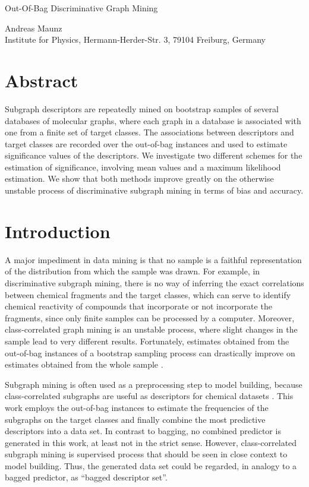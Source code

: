 \documentclass{article}
\begin{document}

\begin{center}
\begin{huge}Out-Of-Bag Discriminative Graph Mining\end{huge}

Andreas Maunz \\Institute for Physics, Hermann-Herder-Str. 3, 79104 Freiburg, Germany
\end{center}

\section{Abstract}
Subgraph descriptors are repeatedly mined on bootstrap samples of several databases of molecular graphs, where each graph in a database is associated with one from a finite set of target classes. 
The associations between descriptors and target classes are recorded over the out-of-bag instances and used to estimate significance values of the descriptors. 
We investigate two different schemes for the estimation of significance, involving mean values and a maximum likelihood estimation.
We show that both methods improve greatly on the otherwise unstable process of discriminative subgraph mining in terms of bias and accuracy.

\section{Introduction}
A major impediment in data mining is that no sample is a faithful representation of the distribution from which the sample was drawn. 
For example, in discriminative subgraph mining, there is no way of inferring the exact correlations between chemical fragments and the target classes, which can serve to identify chemical reactivity of compounds that incorporate or not incorporate the fragments, since only finite samples can be processed by a computer. 
Moreover, class-correlated graph mining is an unstable process, where slight changes in the sample lead to very different results. 
Fortunately, estimates obtained from the out-of-bag instances of a bootstrap sampling process can drastically improve on estimates obtained from the whole sample \cite{bylander02estimating, breiman96oob}.

Subgraph mining is often used as a preprocessing step to model building, because class-correlated subgraphs are useful as descriptors for chemical datasets \cite{bringmann10lego,maunz11efficient}.
This work employs the out-of-bag instances to estimate the frequencies of the subgraphs on the target classes and finally combine the most predictive descriptors into a data set. 
In contrast to bagging, no combined predictor is generated in this work, at least not in the strict sense. 
However, class-correlated subgraph mining is supervised process that should be seen in close context to model building. 
Thus, the generated data set could be regarded, in analogy to a bagged predictor, as ``bagged descriptor set''.
\end{document}
